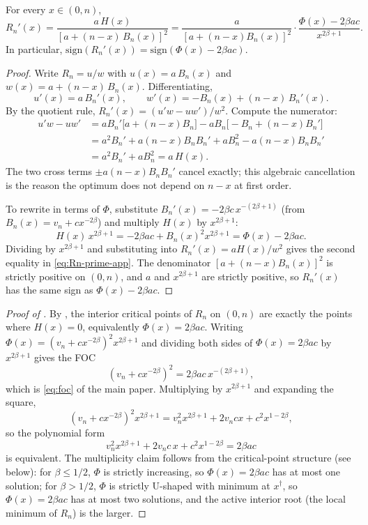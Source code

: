 \begin{lemma}\label{lem:gradient}
For every $x \in (0, n)$,
\begin{equation}\label{eq:Rn-prime-app}
R_n'(x) = \frac{a\, H(x)}{[a + (n-x)\, B_n(x)]^2}
       = \frac{a}{[a + (n-x) B_n(x)]^2}
        \cdot \frac{\Phi(x) - 2\beta a c}{x^{2\beta+1}}.
\end{equation}
In particular, $\mathrm{sign}(R_n'(x)) = \mathrm{sign}(\Phi(x) - 2\beta a c)$.
\end{lemma}
\begin{proof}
Write $R_n = u/w$ with $u(x) = a\, B_n(x)$ and $w(x) = a + (n-x)\, B_n(x)$. Differentiating,
\[
u'(x) = a\, B_n'(x), \qquad
w'(x) = -B_n(x) + (n-x)\, B_n'(x).
\]
By the quotient rule, $R_n'(x) = (u'w - u w') / w^2$. Compute the numerator:
\begin{align*}
u' w - u w'
&= a B_n' \bigl[a + (n-x) B_n\bigr]
   - a B_n \bigl[-B_n + (n-x) B_n'\bigr] \\
&= a^2 B_n' + a(n-x) B_n B_n' + a B_n^2 - a(n-x) B_n B_n' \\
&= a^2 B_n' + a B_n^2 = a\, H(x).
\end{align*}
The two cross terms $\pm a(n-x) B_n B_n'$ cancel exactly; this algebraic cancellation is the reason the optimum does not depend on $n - x$ at first order.

To rewrite in terms of $\Phi$, substitute $B_n'(x) = -2\beta c\, x^{-(2\beta+1)}$ (from $B_n(x) = v_n + c x^{-2\beta}$) and multiply $H(x)$ by $x^{2\beta+1}$:
\[
H(x)\, x^{2\beta+1}
= -2\beta a c + B_n(x)^2 x^{2\beta+1}
= \Phi(x) - 2\beta a c.
\]
Dividing by $x^{2\beta+1}$ and substituting into $R_n'(x) = a H(x)/w^2$ gives the second equality in \cref{eq:Rn-prime-app}. The denominator $[a + (n-x) B_n(x)]^2$ is strictly positive on $(0,n)$, and $a$ and $x^{2\beta+1}$ are strictly positive, so $R_n'(x)$ has the same sign as $\Phi(x) - 2\beta a c$.
\end{proof}

\begin{proof}[Proof of ]
By , the interior critical points of $R_n$ on $(0,n)$ are exactly the points where $H(x) = 0$, equivalently $\Phi(x) = 2\beta a c$. Writing $\Phi(x) = (v_n + c x^{-2\beta})^2 x^{2\beta+1}$ and dividing both sides of $\Phi(x) = 2\beta a c$ by $x^{2\beta+1}$ gives the FOC
\[
(v_n + c x^{-2\beta})^2 = 2\beta a c\, x^{-(2\beta+1)},
\]
which is \cref{eq:foc} of the main paper. Multiplying by $x^{2\beta+1}$ and expanding the square,
\[
(v_n + c x^{-2\beta})^2 x^{2\beta+1}
= v_n^2 x^{2\beta+1} + 2 v_n c x + c^2 x^{1-2\beta},
\]
so the polynomial form
\[
v_n^2 x^{2\beta+1} + 2 v_n c\, x + c^2 x^{1-2\beta} = 2\beta a c
\]
is equivalent. The multiplicity claim follows from the critical-point structure (see  below): for $\beta \le 1/2$, $\Phi$ is strictly increasing, so $\Phi(x) = 2\beta a c$ has at most one solution; for $\beta > 1/2$, $\Phi$ is strictly U-shaped with minimum at $x^\dagger$, so $\Phi(x) = 2\beta a c$ has at most two solutions, and the active interior root (the local minimum of $R_n$) is the larger.
\end{proof}

